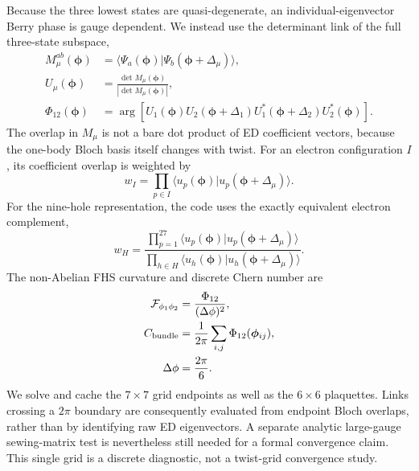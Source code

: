 \documentclass[10pt,twocolumn]{article}
\begin{document}
Because the three lowest states are quasi-degenerate, an individual-eigenvector
Berry phase is gauge dependent.  We instead use the determinant link of the
full three-state subspace,
\begin{align}
M_\mu^{ab}(\bm\phi)&=\langle\Psi_a(\bm\phi)|\Psi_b(\bm\phi+\Delta_\mu)\rangle,\\
U_\mu(\bm\phi)&=\frac{\det M_\mu(\bm\phi)}{|\det M_\mu(\bm\phi)|},\\
\Phi_{12}(\bm\phi)&=\arg\!\left[U_1(\bm\phi)U_2(\bm\phi+\Delta_1)
U_1^*(\bm\phi+\Delta_2)U_2^*(\bm\phi)\right].
\end{align}
The overlap in $M_\mu$ is not a bare dot product of ED coefficient vectors,
because the one-body Bloch basis itself changes with twist.  For an electron
configuration $I$, its coefficient overlap is weighted by
\begin{equation}
 w_I=\prod_{p\in I}\langle u_p(\bm\phi)|u_p(\bm\phi+\Delta_\mu)\rangle.
 \label{eq:electron-overlap-weight}
\end{equation}
For the nine-hole representation, the code uses the exactly equivalent electron
complement,
\begin{equation}
 w_H=\frac{\prod_{p=1}^{27}\langle u_p(\bm\phi)|u_p(\bm\phi+\Delta_\mu)\rangle}
 {\prod_{h\in H}\langle u_h(\bm\phi)|u_h(\bm\phi+\Delta_\mu)\rangle}.
 \label{eq:hole-overlap-weight}
\end{equation}
The non-Abelian FHS curvature and discrete Chern number are
\begin{equation}
 \begin{aligned}
 \mathcal F_{\phi_1\phi_2}&=\frac{\Phi_{12}}{(\Delta\phi)^2},\\
 C_{\rm bundle}&=\frac{1}{2\pi}\sum_{i,j}\Phi_{12}(\bm\phi_{ij}),\\
 \Delta\phi&=\frac{2\pi}{6}.
 \end{aligned}
 \label{eq:fhs-chern}
\end{equation}
We solve and cache the $7\times7$ grid endpoints as well as the $6\times6$
plaquettes.  Links crossing a $2\pi$ boundary are consequently evaluated from
endpoint Bloch overlaps, rather than by identifying raw ED eigenvectors.  A
separate analytic large-gauge sewing-matrix test is nevertheless still needed
for a formal convergence claim.  This single grid is a discrete diagnostic,
not a twist-grid convergence study.
\end{document}
